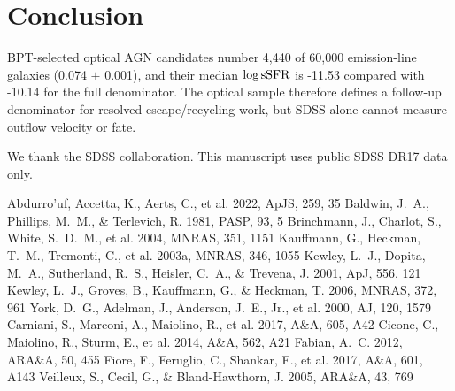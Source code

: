 \documentclass[twocolumn]{aastex631}
\begin{document}
\section{Conclusion}\label{sec:conclusion}
BPT-selected optical AGN candidates number 4,440 of 60,000 emission-line galaxies (0.074 $\pm$ 0.001), and their median $\log {\rm sSFR}$ is -11.53 compared with -10.14 for the full denominator. The optical sample therefore defines a follow-up denominator for resolved escape/recycling work, but SDSS alone cannot measure outflow velocity or fate.

\acknowledgments
We thank the SDSS collaboration. This manuscript uses public SDSS DR17 data only.


\begin{thebibliography}{}
 Abdurro'uf, Accetta, K., Aerts, C., et al. 2022, ApJS, 259, 35
 Baldwin, J.~A., Phillips, M.~M., \& Terlevich, R. 1981, PASP, 93, 5
 Brinchmann, J., Charlot, S., White, S.~D.~M., et al. 2004, MNRAS, 351, 1151
 Kauffmann, G., Heckman, T.~M., Tremonti, C., et al. 2003a, MNRAS, 346, 1055
 Kewley, L.~J., Dopita, M.~A., Sutherland, R.~S., Heisler, C.~A., \& Trevena, J. 2001, ApJ, 556, 121
 Kewley, L.~J., Groves, B., Kauffmann, G., \& Heckman, T. 2006, MNRAS, 372, 961
 York, D.~G., Adelman, J., Anderson, J.~E., Jr., et al. 2000, AJ, 120, 1579
 Carniani, S., Marconi, A., Maiolino, R., et al. 2017, A\&A, 605, A42
 Cicone, C., Maiolino, R., Sturm, E., et al. 2014, A\&A, 562, A21
 Fabian, A.~C. 2012, ARA\&A, 50, 455
 Fiore, F., Feruglio, C., Shankar, F., et al. 2017, A\&A, 601, A143
 Veilleux, S., Cecil, G., \& Bland-Hawthorn, J. 2005, ARA\&A, 43, 769
\end{thebibliography}
\end{document}
